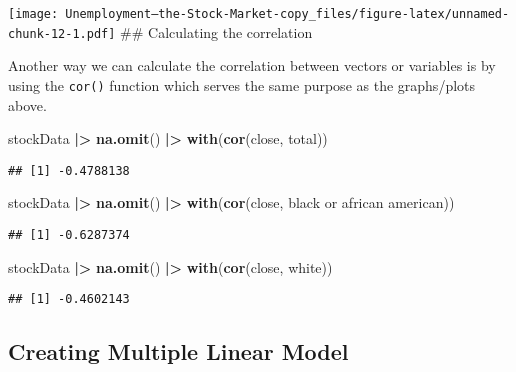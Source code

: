 \documentclass[
]{article}
\newenvironment{Shaded}{\begin{snugshade}}{\end{snugshade}}
\newcommand{\AttributeTok}[1]{\textcolor[rgb]{0.13,0.29,0.53}{#1}}
\newcommand{\FunctionTok}[1]{\textcolor[rgb]{0.13,0.29,0.53}{\textbf{#1}}}
\newcommand{\NormalTok}[1]{#1}
\newcommand{\SpecialCharTok}[1]{\textcolor[rgb]{0.81,0.36,0.00}{\textbf{#1}}}
\newcommand{\StringTok}[1]{\textcolor[rgb]{0.31,0.60,0.02}{#1}}
\begin{document}
\texttt{[image: Unemployment---the-Stock-Market-copy\_files/figure-latex/unnamed-chunk-12-1.pdf]}
\#\# Calculating the correlation

Another way we can calculate the correlation between vectors or
variables is by using the \texttt{cor()} function which serves the same
purpose as the graphs/plots above.

\begin{Shaded}
\begin{Highlighting}[]
\NormalTok{stockData }\SpecialCharTok{|\textgreater{}}
  \FunctionTok{na.omit}\NormalTok{() }\SpecialCharTok{|\textgreater{}}
  \FunctionTok{with}\NormalTok{(}\FunctionTok{cor}\NormalTok{(close, total))}
\end{Highlighting}
\end{Shaded}

\begin{verbatim}
## [1] -0.4788138
\end{verbatim}

\begin{Shaded}
\begin{Highlighting}[]
\NormalTok{stockData }\SpecialCharTok{|\textgreater{}}
  \FunctionTok{na.omit}\NormalTok{() }\SpecialCharTok{|\textgreater{}}
  \FunctionTok{with}\NormalTok{(}\FunctionTok{cor}\NormalTok{(close, }\StringTok{\textasciigrave{}}\AttributeTok{black or african american}\StringTok{\textasciigrave{}}\NormalTok{))}
\end{Highlighting}
\end{Shaded}

\begin{verbatim}
## [1] -0.6287374
\end{verbatim}

\begin{Shaded}
\begin{Highlighting}[]
\NormalTok{stockData }\SpecialCharTok{|\textgreater{}}
  \FunctionTok{na.omit}\NormalTok{() }\SpecialCharTok{|\textgreater{}}
  \FunctionTok{with}\NormalTok{(}\FunctionTok{cor}\NormalTok{(close, white))}
\end{Highlighting}
\end{Shaded}

\begin{verbatim}
## [1] -0.4602143
\end{verbatim}

\hypertarget{creating-multiple-linear-model}{%
\subsection{Creating Multiple Linear
Model}\label{creating-multiple-linear-model}}
\end{document}
